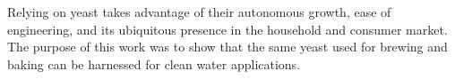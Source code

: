 \begin{abstractpage}
Relying on yeast takes advantage of their autonomous growth, ease of engineering, and its ubiquitous presence in the household and consumer market.
The purpose of this work was to show that the same yeast used for brewing and baking can be harnessed for clean water applications.

\end{abstractpage}
